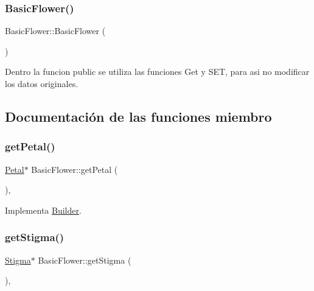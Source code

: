 \subsubsection{\texorpdfstring{BasicFlower()}{BasicFlower()}}
{\footnotesize\ttfamily Basic\+Flower\+::\+Basic\+Flower (\begin{DoxyParamCaption}{ }\end{DoxyParamCaption})\hspace{0.3cm}{\ttfamily [inline]}}

Dentro la funcion public se utiliza las funciones Get y S\+ET, para asi no modificar los datos originales. 

\subsection{Documentación de las funciones miembro}
\mbox{\label{class_basic_flower_a580611b6b079b875875f06dae0657c38}} 
\subsubsection{\texorpdfstring{getPetal()}{getPetal()}}
{\footnotesize\ttfamily \mbox{\hyperlink{class_petal}{Petal}}$\ast$ Basic\+Flower\+::get\+Petal (\begin{DoxyParamCaption}{ }\end{DoxyParamCaption})\hspace{0.3cm}{\ttfamily [inline]}, {\ttfamily [virtual]}}



Implementa \mbox{\hyperlink{class_builder_a95f62b265810db9f34db00511ce3d677}{Builder}}.

\mbox{\label{class_basic_flower_a30bafa765344b162b3a49c80a70c78ee}} 
\subsubsection{\texorpdfstring{getStigma()}{getStigma()}}
{\footnotesize\ttfamily \mbox{\hyperlink{class_stigma}{Stigma}}$\ast$ Basic\+Flower\+::get\+Stigma (\begin{DoxyParamCaption}{ }\end{DoxyParamCaption})\hspace{0.3cm}{\ttfamily [inline]}, {\ttfamily [virtual]}}



